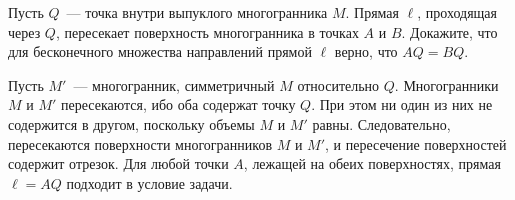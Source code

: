 \problem
Пусть $Q$~--- точка внутри выпуклого многогранника $M$.
Прямая $\ell$, проходящая через $Q$, пересекает поверхность многогранника в
точках $A$ и $B$.
Докажите, что для бесконечного множества направлений прямой $\ell$ верно, что
$AQ = BQ$.

\solution
Пусть $M'$~--- многогранник, симметричный $M$ относительно $Q$.
Многогранники $M$ и $M'$ пересекаются, ибо оба содержат точку $Q$.
При этом ни один из них не содержится в другом, поскольку объемы $M$ и $M'$
равны.
Следовательно, пересекаются поверхности многогранников $M$ и $M'$, и
пересечение поверхностей содержит отрезок.
Для любой точки $A$, лежащей на обеих поверхностях, прямая $\ell = AQ$ подходит
в условие задачи. 
\endproblem
